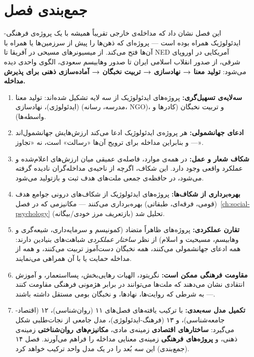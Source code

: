 \section{جمع‌بندی فصل}
\label{sec:ch13-conclusion}

این فصل نشان داد که مداخله‌ی خارجی تقریباً همیشه با یک پروژه‌ی فرهنگی-ایدئولوژیک همراه بوده است — پروژه‌ای که ذهن‌ها را پیش از سرزمین‌ها یا همراه با آن‌ها فتح می‌کند. از میسیونرهای مسیحی در آفریقا تا NED آمریکایی در اوروپای شرقی، از صدور انقلاب اسلامی ایران تا صدور وهابیسم سعودی، الگوی واحدی دیده می‌شود: \textbf{تولید معنا → نهادسازی → تربیت نخبگان → آماده‌سازی ذهنی برای پذیرش مداخله.}

\begin{tcolorbox}[wavebox, title={یافته‌های کلیدی فصل ۱۳}]
\begin{enumerate}
\item \textbf{سه‌لایه‌ی تسهیل‌گری:} پروژه‌های ایدئولوژیک از سه لایه تشکیل شده‌اند: تولید معنا (ایدئولوژی)، نهادسازی (مدرسه، رسانه، NGO)، و تربیت نخبگان (کادرها و واسطه‌ها).

\item \textbf{ادعای جهانشمولی:} هر پروژه‌ی ایدئولوژیک ادعا می‌کند ارزش‌هایش جهانشمول‌اند — و بنابراین مداخله برای ترویج آن‌ها «رسالت» است، نه «تجاوز».

\item \textbf{شکاف شعار و عمل:} در همه‌ی موارد، فاصله‌ی عمیقی میان ارزش‌های اعلام‌شده و عملکرد واقعی وجود دارد. این شکاف، اگرچه از ناحیه‌ی مداخله‌گران نادیده گرفته می‌شود، در حافظه‌ی جمعی ملت‌های هدف ثبت و بازتولید می‌شود.

\item \textbf{بهره‌برداری از شکاف‌ها:} پروژه‌های ایدئولوژیک از شکاف‌های درونی جوامع هدف (قومی، فرقه‌ای، طبقاتی) بهره‌برداری می‌کنند — مکانیزمی که در فصل~\ref{ch:social-psychology} (بازتعریف مرز خودی/بیگانه) تحلیل شد.

\item \textbf{تقارن عملکردی:} پروژه‌های ظاهراً متضاد (کمونیسم و سرمایه‌داری، شیعه‌گری و وهابیسم، مسیحیت و اسلام) از نظر \textit{ساختار عملکردی} شباهت‌های بنیادین دارند: همه ادعای جهانشمولی می‌کنند، همه نخبگان دست‌آموز تربیت می‌کنند، و همه از مداخله حمایت یا با آن همراهی می‌نمایند.

\item \textbf{مقاومت فرهنگی ممکن است:} نگریتود، الهیات رهایی‌بخش، پسااستعمار، و آموزش انتقادی نشان می‌دهند که ملت‌ها می‌توانند در برابر هژمونی فرهنگی مقاومت کنند — به شرطی که روایت‌ها، نهادها، و نخبگان بومی مستقل داشته باشند.

\item \textbf{تکمیل مدل سه‌بعدی:} با ترکیب یافته‌های فصل‌های ۱۱ (روان‌شناسی)، ۱۲ (اقتصاد-جامعه‌شناسی)، و ۱۳ (فرهنگ-ایدئولوژی)، مدل جامعی از نجات‌طلبی شکل می‌گیرد: \textbf{ساختارهای اقتصادی} زمینه‌ی مادی، \textbf{مکانیزم‌های روان‌شناختی} زمینه‌ی ذهنی، و \textbf{پروژه‌های فرهنگی} زمینه‌ی معنایی مداخله را فراهم می‌آورند. فصل ۱۴ (جمع‌بندی) این سه بُعد را در یک مدل واحد ترکیب خواهد کرد.
\end{enumerate}
\end{tcolorbox}

